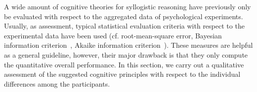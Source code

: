 \documentclass[12pt]{article}
\begin{document}
A wide amount of cognitive theories for syllogistic reasoning have previously only be evaluated with respect to the aggregated data of psychological experiments.
Usually, as assessment, typical statistical evaluation criteria with respect to the experimental data 
 have been used (cf. root-mean-square error, Bayesian information criterion~\cite{schwarz1978}, Akaike information criterion~\cite{akaike1974new}).
 These measures are helpful as a general guideline, however, their major drawback is that they only compute the quantitative overall performance.
 In this section, we carry out a qualitative assessment of the suggested cognitive principles with respect to the individual differences
  among the participants.
\end{document}
